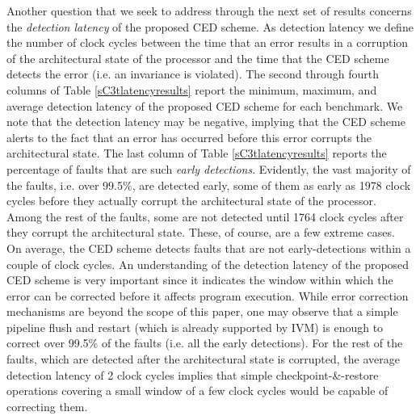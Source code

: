 \documentclass[12pt]{yalephd}
\newcommand{\snp}[1] {\noindent {\underline {#1}}}
\begin{document}
\snp{Detection latency:} Another question that we seek to address through the next set of results concerns the {\em detection latency} of the proposed CED scheme. As detection latency we define the number of clock cycles between the time that an error results in a corruption of the architectural state of the processor and the time that the CED scheme detects the error (i.e. an invariance is violated). The second through fourth columns of Table \ref{sC3tlatencyresults} report the minimum, maximum, and average detection latency of the proposed CED scheme for each benchmark. We note that the detection latency may be negative, implying that the CED scheme alerts to the fact that an error has occurred before this error corrupts the architectural state. The last column of Table \ref{sC3tlatencyresults} reports the percentage of faults that are such {\em early detections}. Evidently, the vast majority of the faults, i.e. over 99.5\%, are detected early, some of them as early as 1978 clock cycles before they actually corrupt the architectural state of the processor. Among the rest of the faults, some are not detected until 1764 clock cycles after they corrupt the architectural state. These, of course, are a few extreme cases. On average, the CED scheme detects  faults that are not early-detections within a couple of clock cycles. An understanding of the detection latency of the proposed CED scheme is very important since it indicates the window within which the error can be corrected before it affects program execution. While error correction mechanisms are beyond the scope of this paper, one may observe that a simple pipeline flush and restart (which is already supported by IVM) is enough to correct over 99.5\% of the faults (i.e. all the early detections). For the rest of the faults, which are detected after the architectural state is corrupted, the average detection latency of 2 clock cycles implies that simple checkpoint-\&-restore operations covering a small window of a few clock cycles would be capable of correcting them.
\end{document}
